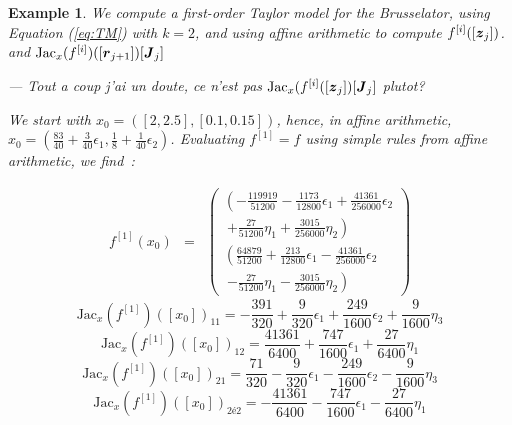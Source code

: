 \documentclass{sig-alternate-05-2015} %
\newcommand\ForAuthors[1]%
 {\par\smallskip                     %
  \begin{center}%
   \fbox%
   {\parbox{0.9\linewidth}%
    {\raggedright\sc--- #1}%
   }%
  \end{center}%
  \par\smallskip                     %
 }
\newtheorem{example}{Example}
\begin{document}
\begin{example}
\label{running3}
We compute a first-order Taylor model for the Brusselator, using Equation
(\ref{eq:TM}) with $k=2$, and using affine arithmetic to compute $f^{[i]}([{\z}_j])$. 
and $\mbox{Jac}_x(f^{[i]})([\r_{j+1}])[\J_j]$ 
\ForAuthors{Tout a coup j'ai un doute, ce n'est pas 
$\mbox{Jac}_x(f^{[i]}([\z_j])[\J_j]$ plutot?} We start with 
$x_0=\left([2,2.5],[0.1,0.15]\right)$, hence, in affine arithmetic,
$x_0=\left(\frac{83}{40}+\frac{3}{40}\epsilon_1,
\frac{1}{8}+\frac{1}{40}\epsilon_2\right)$. Evaluating $f^{[1]}=f$ using
simple rules from affine arithmetic, we find~: 

\begin{eqnarray}%
f^{[1]}(x_0) & = & \left(\begin{array}{c}
\left(-\frac{119919}{51200}-\frac{1173}{12800} \epsilon_1+\frac{41361}{256000}\epsilon_2
\right.
\\
\ \left.+\frac{27}{51200}\eta_1+\frac{3015}{256000}\eta_2\right) \\ 
\left(\frac{64879}{51200}+\frac{213}{12800}\epsilon_1-\frac{41361}{256000}\epsilon_2
\right.\\
\ \left. -\frac{27}{51200}\eta_1
-\frac{3015}{256000}\eta_2 \right) 
\end{array}\right)
\end{eqnarray}
\begin{equation}
\mbox{Jac}_x(f^{[1]})([x_0])_{11} %
= 
-\frac{391}{320}+\frac{9}{320}\epsilon_1+\frac{249}{1600}\epsilon_2+\frac{9}{1600}\eta_3%
\end{equation}
\begin{equation}
\mbox{Jac}_x(f^{[1]})([x_0])_{12} %
= 
\frac{41361}{6400}+\frac{747}{1600}\epsilon_1+\frac{27}{6400}\eta_1%
\end{equation}
\begin{equation}
\mbox{Jac}_x(f^{[1]})([x_0])_{21} %
= 
\frac{71}{320}-\frac{9}{320}\epsilon_1-\frac{249}{1600}\epsilon_2-\frac{9}{1600}\eta_3%
\end{equation}
\begin{equation}
\mbox{Jac}_x(f^{[1]})([x_0])_{2é2} %
= 
-\frac{41361}{6400}-\frac{747}{1600}\epsilon_1-\frac{27}{6400}\eta_1
\label{firstderivative}
\end{equation}


\end{example}
\end{document}
